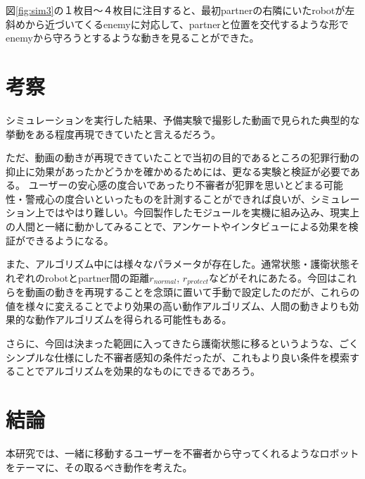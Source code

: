 \documentclass{kuisthesis}
\begin{document}
図\ref{fig:sim3}の１枚目〜４枚目に注目すると、最初partnerの右隣にいたrobotが左斜めから近づいてくるenemyに対応して、partnerと位置を交代するような形でenemyから守ろうとするような動きを見ることができた。







\section{考察}

シミュレーションを実行した結果、予備実験で撮影した動画で見られた典型的な挙動をある程度再現できていたと言えるだろう。

ただ、動画の動きが再現できていたことで当初の目的であるところの犯罪行動の抑止に効果があったかどうかを確かめるためには、更なる実験と検証が必要である。
ユーザーの安心感の度合いであったり不審者が犯罪を思いとどまる可能性・警戒心の度合いといったものを計測することができれば良いが、シミュレーション上ではやはり難しい。今回製作したモジュールを実機に組み込み、現実上の人間と一緒に動かしてみることで、アンケートやインタビューによる効果を検証ができるようになる。

また、アルゴリズム中には様々なパラメータが存在した。通常状態・護衛状態それぞれのrobotとpartner間の距離$r_{normal}$, $r_{protect}$などがそれにあたる。今回はこれらを動画の動きを再現することを念頭に置いて手動で設定したのだが、これらの値を様々に変えることでより効果の高い動作アルゴリズム、人間の動きよりも効果的な動作アルゴリズムを得られる可能性もある。

さらに、今回は決まった範囲に入ってきたら護衛状態に移るというような、ごくシンプルな仕様にした不審者感知の条件だったが、これもより良い条件を模索することでアルゴリズムを効果的なものにできるであろう。


\section{結論}
本研究では、一緒に移動するユーザーを不審者から守ってくれるようなロボットをテーマに、その取るべき動作を考えた。
\end{document}
